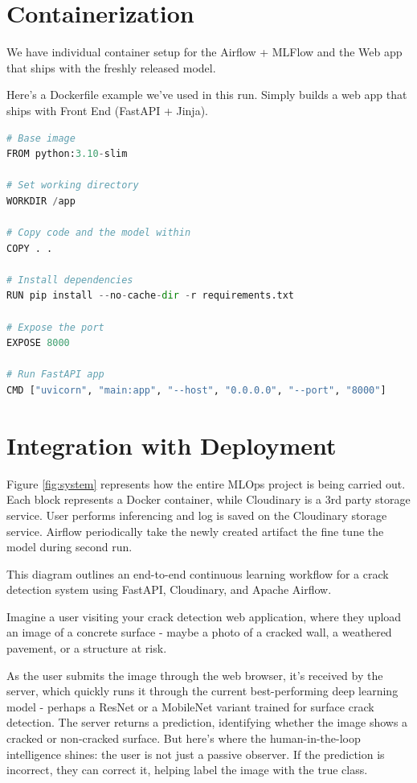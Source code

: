 \section{Containerization}

We have individual container setup for the Airflow + MLFlow and the Web app that ships with the freshly released model.

Here's a Dockerfile example we've used in this run. Simply builds a web app that ships with Front End (FastAPI + Jinja).

\begin{lstlisting}[language=Python]
# Base image
FROM python:3.10-slim

# Set working directory
WORKDIR /app

# Copy code and the model within
COPY . .

# Install dependencies
RUN pip install --no-cache-dir -r requirements.txt

# Expose the port
EXPOSE 8000

# Run FastAPI app
CMD ["uvicorn", "main:app", "--host", "0.0.0.0", "--port", "8000"]

\end{lstlisting}

\section{Integration with Deployment}

Figure \ref{fig:system} represents how the entire MLOps project is being carried out. Each block represents a Docker container, while Cloudinary is a 3rd party storage service. User performs inferencing and log is saved on the Cloudinary storage service. Airflow periodically take the newly created artifact the fine tune the model during second run.

This diagram outlines an end-to-end continuous learning workflow for a crack detection system using FastAPI, Cloudinary, and Apache Airflow. 

Imagine a user visiting your crack detection web application, where they upload an image of a concrete surface - maybe a photo of a cracked wall, a weathered pavement, or a structure at risk.

As the user submits the image through the web browser, it's received by the server, which quickly runs it through the current best-performing deep learning model - perhaps a ResNet or a MobileNet variant trained for surface crack detection. The server returns a prediction, identifying whether the image shows a cracked or non-cracked surface. But here's where the human-in-the-loop intelligence shines: the user is not just a passive observer. If the prediction is incorrect, they can correct it, helping label the image with the true class.

